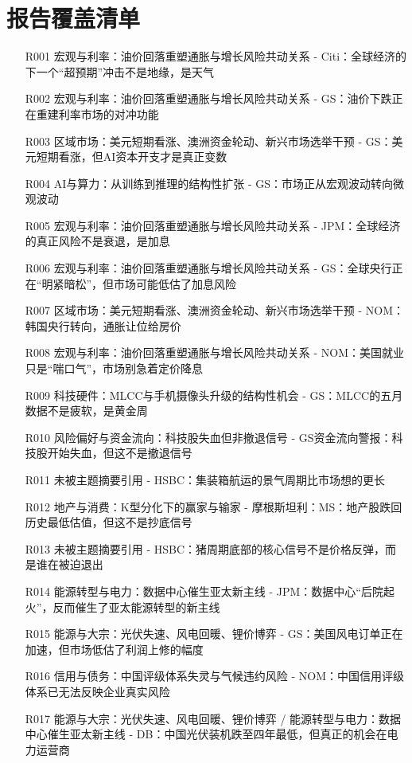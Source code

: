 \documentclass[11pt]{ctexart}
\begin{document}
\section{报告覆盖清单}
\begin{itemize}
  \item [R001] 宏观与利率：油价回落重塑通胀与增长风险共动关系 - Citi：全球经济的下一个“超预期”冲击不是地缘，是天气
  \item [R002] 宏观与利率：油价回落重塑通胀与增长风险共动关系 - GS：油价下跌正在重建利率市场的对冲功能
  \item [R003] 区域市场：美元短期看涨、澳洲资金轮动、新兴市场选举干预 - GS：美元短期看涨，但AI资本开支才是真正变数
  \item [R004] AI与算力：从训练到推理的结构性扩张 - GS：市场正从宏观波动转向微观波动
  \item [R005] 宏观与利率：油价回落重塑通胀与增长风险共动关系 - JPM：全球经济的真正风险不是衰退，是加息
  \item [R006] 宏观与利率：油价回落重塑通胀与增长风险共动关系 - GS：全球央行正在“明紧暗松”，但市场可能低估了加息风险
  \item [R007] 区域市场：美元短期看涨、澳洲资金轮动、新兴市场选举干预 - NOM：韩国央行转向，通胀让位给房价
  \item [R008] 宏观与利率：油价回落重塑通胀与增长风险共动关系 - NOM：美国就业只是“喘口气”，市场别急着定价降息
  \item [R009] 科技硬件：MLCC与手机摄像头升级的结构性机会 - GS：MLCC的五月数据不是疲软，是黄金周
  \item [R010] 风险偏好与资金流向：科技股失血但非撤退信号 - GS资金流向警报：科技股开始失血，但这不是撤退信号
  \item [R011] 未被主题摘要引用 - HSBC：集装箱航运的景气周期比市场想的更长
  \item [R012] 地产与消费：K型分化下的赢家与输家 - 摩根斯坦利：MS：地产股跌回历史最低估值，但这不是抄底信号
  \item [R013] 未被主题摘要引用 - HSBC：猪周期底部的核心信号不是价格反弹，而是谁在被迫退出
  \item [R014] 能源转型与电力：数据中心催生亚太新主线 - JPM：数据中心“后院起火”，反而催生了亚太能源转型的新主线
  \item [R015] 能源与大宗：光伏失速、风电回暖、锂价博弈 - GS：美国风电订单正在加速，但市场低估了利润上修的幅度
  \item [R016] 信用与债务：中国评级体系失灵与气候违约风险 - NOM：中国信用评级体系已无法反映企业真实风险
  \item [R017] 能源与大宗：光伏失速、风电回暖、锂价博弈 / 能源转型与电力：数据中心催生亚太新主线 - DB：中国光伏装机跌至四年最低，但真正的机会在电力运营商

\end{itemize}
\end{document}
